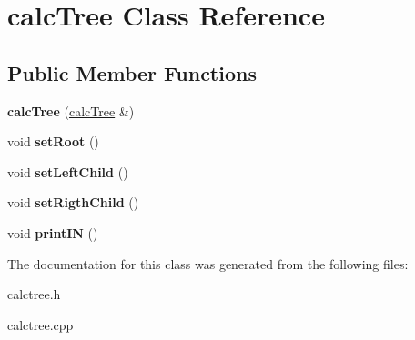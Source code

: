\hypertarget{classcalcTree}{\section{calc\-Tree \-Class \-Reference}
\label{classcalcTree}
}
\subsection*{\-Public \-Member \-Functions}
\begin{DoxyCompactItemize}
\item 
\hypertarget{classcalcTree_a1534bf05dfd8727f2aa97ddfc25da71c}{{\bfseries calc\-Tree} (\hyperlink{classcalcTree}{calc\-Tree} \&)}\label{classcalcTree_a1534bf05dfd8727f2aa97ddfc25da71c}

\item 
\hypertarget{classcalcTree_a2ee9a44c9bc422853a1dca273150534b}{void {\bfseries set\-Root} ()}\label{classcalcTree_a2ee9a44c9bc422853a1dca273150534b}

\item 
\hypertarget{classcalcTree_aba59bdc84e2b7d9d5348b2873182d63e}{void {\bfseries set\-Left\-Child} ()}\label{classcalcTree_aba59bdc84e2b7d9d5348b2873182d63e}

\item 
\hypertarget{classcalcTree_a66cfc36c97ab4e29be376ae37eda4b50}{void {\bfseries set\-Rigth\-Child} ()}\label{classcalcTree_a66cfc36c97ab4e29be376ae37eda4b50}

\item 
\hypertarget{classcalcTree_a42996ef78fb1952bbe0bf4fc1bd5ed88}{void {\bfseries print\-I\-N} ()}\label{classcalcTree_a42996ef78fb1952bbe0bf4fc1bd5ed88}

\end{DoxyCompactItemize}


\-The documentation for this class was generated from the following files\-:\begin{DoxyCompactItemize}
\item 
calctree.\-h\item 
calctree.\-cpp\end{DoxyCompactItemize}
